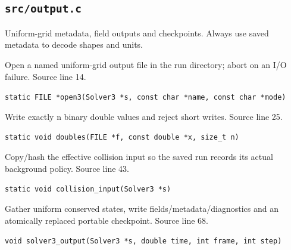 \subsection{\texttt{src/output.c}}
Uniform-grid metadata, field outputs and checkpoints. Always use saved metadata to decode shapes and units.
\begin{description}[style=nextline,leftmargin=0pt,labelindent=0pt,labelwidth=0pt,labelsep=0pt]
\item[\texttt{open3}] Open a named uniform-grid output file in the run directory; abort on an I/O failure. Source line 14.\par
{\small\nolinkurl{static FILE *open3(Solver3 *s, const char *name, const char *mode)}}
\item[\texttt{doubles}] Write exactly n binary double values and reject short writes. Source line 25.\par
{\small\nolinkurl{static void doubles(FILE *f, const double *x, size_t n)}}
\item[\texttt{collision\_input}] Copy/hash the effective collision input so the saved run records its actual background policy. Source line 43.\par
{\small\nolinkurl{static void collision_input(Solver3 *s)}}
\item[\texttt{solver3\_output}] Gather uniform conserved states, write fields/metadata/diagnostics and an atomically replaced portable checkpoint. Source line 68.\par
{\small\nolinkurl{void solver3_output(Solver3 *s, double time, int frame, int step)}}
\end{description}
